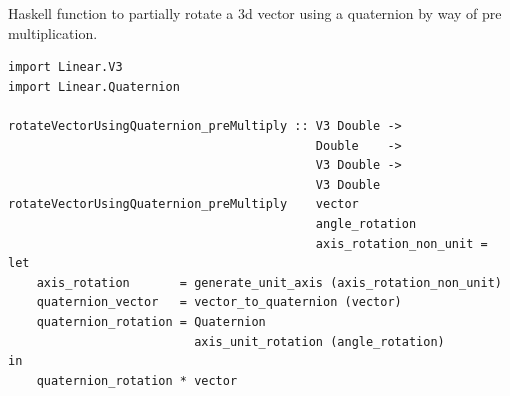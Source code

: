 
\begin{frame}[t, fragile]{Haskell function to partially rotate a 3d vector using a quaternion by way of pre multiplication.}

\begin{verbatim}
import Linear.V3
import Linear.Quaternion

rotateVectorUsingQuaternion_preMultiply :: V3 Double ->
                                           Double    ->
                                           V3 Double ->
                                           V3 Double
rotateVectorUsingQuaternion_preMultiply    vector
                                           angle_rotation
                                           axis_rotation_non_unit =
let
    axis_rotation       = generate_unit_axis (axis_rotation_non_unit)
    quaternion_vector   = vector_to_quaternion (vector)
    quaternion_rotation = Quaternion
                          axis_unit_rotation (angle_rotation)
in
    quaternion_rotation * vector
\end{verbatim}

\end{frame}